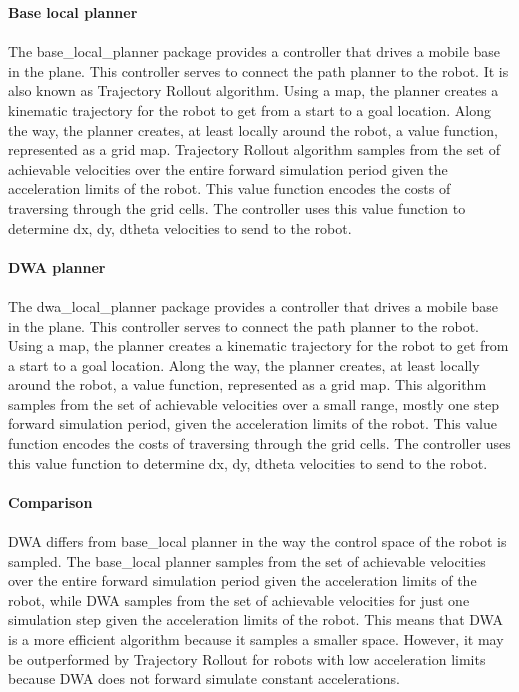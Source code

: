 \documentclass[12pt]{article}
\begin{document}
\textbf{Base local planner}\\ \\
The base\_local\_planner package provides a controller that drives a mobile base in the plane. This controller serves to connect the path planner to the robot. It is also known as Trajectory Rollout algorithm. Using a map, the planner creates a kinematic trajectory for the robot to get from a start to a goal location. Along the way, the planner creates, at least locally around the robot, a value function, represented as a grid map. Trajectory Rollout algorithm samples from the set of achievable velocities over the entire forward simulation period given the acceleration limits of the robot. This value function encodes the costs of traversing through the grid cells. The controller uses this value function to determine dx, dy, dtheta velocities to send to the robot.\\ \\
\textbf{DWA planner}\\ \\
The dwa\_local\_planner package provides a controller that drives a mobile base in the plane. This controller serves to connect the path planner to the robot. Using a map, the planner creates a kinematic trajectory for the robot to get from a start to a goal location. Along the way, the planner creates, at least locally around the robot, a value function, represented as a grid map. This algorithm samples from the set of achievable velocities over a small range, mostly one step forward simulation period, given the acceleration limits of the robot. This value function encodes the costs of traversing through the grid cells. The controller uses this value function to determine dx, dy, dtheta velocities to send to the robot.\\ \\
\textbf{Comparison}
\\ \\
DWA differs from base\_local planner in the way the control space of the robot is sampled. The base\_local planner samples from the set of achievable velocities over the entire forward simulation period given the acceleration limits of the robot, while DWA samples from the set of achievable velocities for just one simulation step given the acceleration limits of the robot. This means that DWA is a more efficient algorithm because it samples a smaller space. However, it may be outperformed by Trajectory Rollout for robots with low acceleration limits because DWA does not forward simulate constant accelerations.\\ \\
\end{document}
